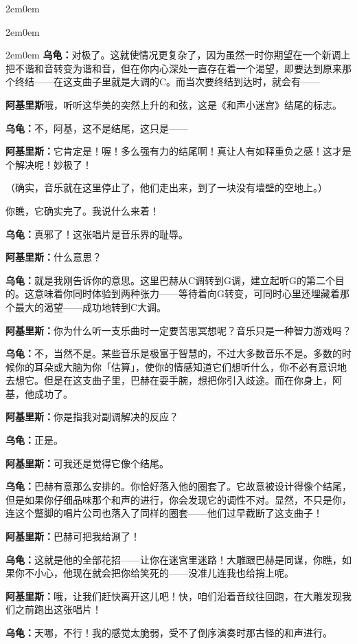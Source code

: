 \documentclass[
  12pt,
  twoside,
  openright,
  oldfontcommands,
]{memoir}
\newcommand{\dialogname}[1]{{\heifamily\bfseries #1}}
\begin{document}
\begin{adjustwidth}{2em}{0em}
\begin{adjustwidth}{2em}{0em}
\begin{adjustwidth}{2em}{0em}
\dialogname{乌龟：}对极了。这就使情况更复杂了，因为虽然一时你期望在一个新调上把不谐和音转变为谐和音，但在你内心深处一直存在着一个渴望，即要达到原来那个终结------在这支曲子里就是大调的C。而当次要终结到达时，就会有------

\dialogname{阿基里斯}哦，听听这华美的突然上升的和弦，这是《和声小迷宫》结尾的标志。

\dialogname{乌龟：}不，阿基，这不是结尾，这只是------

\dialogname{阿基里斯：}它肯定是！喔！多么强有力的结尾啊！真让人有如释重负之感！这才是个解决呢！妙极了！

（确实，音乐就在这里停止了，他们走出来，到了一块没有墙壁的空地上。）

你瞧，它确实完了。我说什么来着！

\dialogname{乌龟：}真邪了！这张唱片是音乐界的耻辱。

\dialogname{阿基里斯：}什么意思？

\dialogname{乌龟：}就是我刚告诉你的意思。这里巴赫从C调转到G调，建立起听G的第二个目的。这意味着你同时体验到两种张力------等待着向G转变，可同时心里还埋藏着那个最大的渴望------成功地转到C大调。

\dialogname{阿基里斯：}你为什么听一支乐曲时一定要苦思冥想呢？音乐只是一种智力游戏吗？

\dialogname{乌龟：}不，当然不是。某些音乐是极富于智慧的，不过大多数音乐不是。多数的时候你的耳朵或大脑为你「估算」，使你的情感知道它们想听什么，你不必有意识地去想它。但是在这支曲子里，巴赫在耍手腕，想把你引入歧途。而在你身上，阿基，他成功了。

\dialogname{阿基里斯：}你是指我对副调解决的反应？

\dialogname{乌龟：}正是。

\dialogname{阿基里斯：}可我还是觉得它像个结尾。

\dialogname{乌龟：}巴赫有意那么安排的。你恰好落入他的圈套了。它故意被设计得像个结尾，但是如果你仔细品味那个和声的进行，你会发现它的调性不对。显然，不只是你，连这个蹩脚的唱片公司也落入了同样的圈套------他们过早截断了这支曲子！

\dialogname{阿基里斯：}巴赫可把我给涮了！

\dialogname{乌龟：}这就是他的全部花招------让你在迷宫里迷路！大雕跟巴赫是同谋，你瞧，如果你不小心，他现在就会把你给笑死的------没准儿连我也给捎上呢。

\dialogname{阿基里斯：}哦，让我们赶快离开这儿吧！快，咱们沿着音纹往回跑，在大雕发现我们之前跑出这张唱片！

\dialogname{乌龟：}天哪，不行！我的感觉太脆弱，受不了倒序演奏时那古怪的和声进行。


\end{adjustwidth}
\end{adjustwidth}
\end{adjustwidth}
\end{document}
